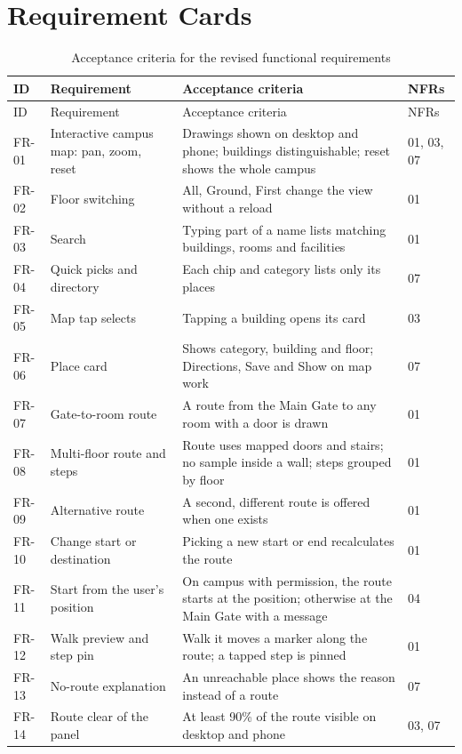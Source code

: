 \documentclass[12pt,a4paper]{report}
\newcommand{\tablespacing}{\singlespacing\small}
\begin{document}
\chapter{Requirement Cards}\label{app:cards}
{\tablespacing
\begin{longtable}{p{1.3cm}p{5.6cm}p{5.6cm}p{1.4cm}}
\caption{Acceptance criteria for the revised functional requirements}\label{tab:cards}\\
\toprule
ID & Requirement & Acceptance criteria & NFRs \\
\midrule\endfirsthead
\toprule
ID & Requirement & Acceptance criteria & NFRs \\
\midrule\endhead
\bottomrule\endfoot
FR-01 & Interactive campus map: pan, zoom, reset & Drawings shown on desktop and phone; buildings distinguishable; reset shows the whole campus & 01, 03, 07 \\
FR-02 & Floor switching & All, Ground, First change the view without a reload & 01 \\
FR-03 & Search & Typing part of a name lists matching buildings, rooms and facilities & 01 \\
FR-04 & Quick picks and directory & Each chip and category lists only its places & 07 \\
FR-05 & Map tap selects & Tapping a building opens its card & 03 \\
FR-06 & Place card & Shows category, building and floor; Directions, Save and Show on map work & 07 \\
FR-07 & Gate-to-room route & A route from the Main Gate to any room with a door is drawn & 01 \\
FR-08 & Multi-floor route and steps & Route uses mapped doors and stairs; no sample inside a wall; steps grouped by floor & 01 \\
FR-09 & Alternative route & A second, different route is offered when one exists & 01 \\
FR-10 & Change start or destination & Picking a new start or end recalculates the route & 01 \\
FR-11 & Start from the user's position & On campus with permission, the route starts at the position; otherwise at the Main Gate with a message & 04 \\
FR-12 & Walk preview and step pin & Walk it moves a marker along the route; a tapped step is pinned & 01 \\
FR-13 & No-route explanation & An unreachable place shows the reason instead of a route & 07 \\
FR-14 & Route clear of the panel & At least 90\% of the route visible on desktop and phone & 03, 07 \\

\end{longtable}}
\end{document}
